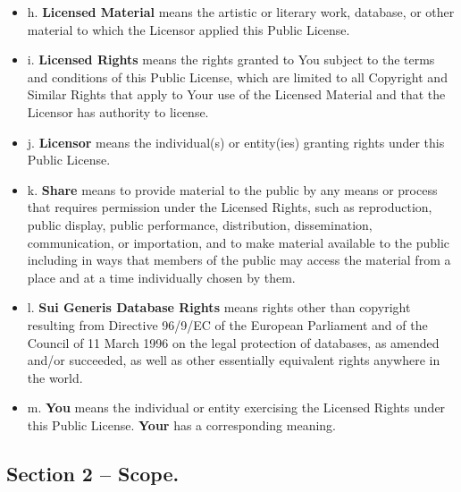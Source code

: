 \begin{itemize}
		\item h. \textbf{Licensed Material} means the artistic or literary work, database, or other material to which the Licensor applied this Public License.
		\item i. \textbf{Licensed Rights} means the rights granted to You subject to the terms and conditions of this Public License, which are limited to all Copyright and Similar Rights that apply to Your use of the Licensed Material and that the Licensor has authority to license.
		\item j. \textbf{Licensor} means the individual(s) or entity(ies) granting rights under this Public License.
		\item k. \textbf{Share} means to provide material to the public by any means or process that requires permission under the Licensed Rights, such as reproduction, public display, public performance, distribution, dissemination, communication, or importation, and to make material available to the public including in ways that members of the public may access the material from a place and at a time individually chosen by them.
		\item l. \textbf{Sui Generis Database Rights} means rights other than copyright resulting from Directive 96/9/EC of the European Parliament and of the Council of 11 March 1996 on the legal protection of databases, as amended and/or succeeded, as well as other essentially equivalent rights anywhere in the world.
		\item m. \textbf{You} means the individual or entity exercising the Licensed Rights under this Public License. \textbf{Your} has a corresponding meaning.
	\end{itemize}
      
\subsection*{Section 2 – Scope.}    
